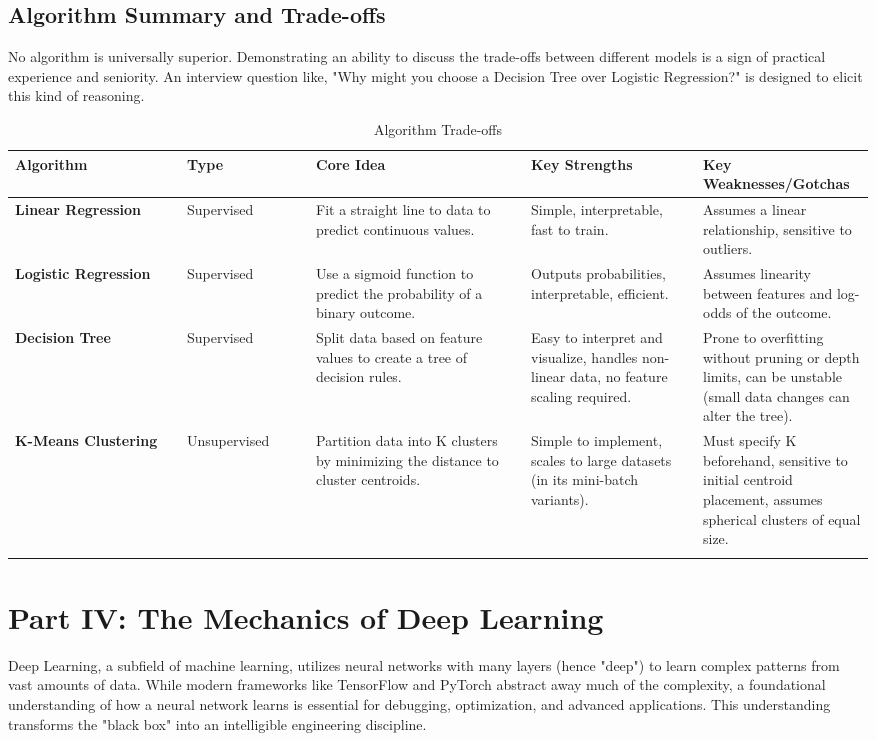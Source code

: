 \documentclass[11pt,a4paper]{article}
\begin{document}
\subsection{Algorithm Summary and Trade-offs}

No algorithm is universally superior. Demonstrating an ability to discuss the trade-offs between different models is a sign of practical experience and seniority. An interview question like, "Why might you choose a Decision Tree over Logistic Regression?" is designed to elicit this kind of reasoning.

\begin{longtable}{p{0.2\linewidth} p{0.15\linewidth} p{0.25\linewidth} p{0.2\linewidth} p{0.2\linewidth}}
\toprule
\textbf{Algorithm} & \textbf{Type} & \textbf{Core Idea} & \textbf{Key Strengths} & \textbf{Key Weaknesses/Gotchas} \\
\midrule
\endhead
\textbf{Linear Regression} & Supervised & Fit a straight line to data to predict continuous values. & Simple, interpretable, fast to train. & Assumes a linear relationship, sensitive to outliers. \\
\midrule
\textbf{Logistic Regression} & Supervised & Use a sigmoid function to predict the probability of a binary outcome. & Outputs probabilities, interpretable, efficient. & Assumes linearity between features and log-odds of the outcome. \\
\midrule
\textbf{Decision Tree} & Supervised & Split data based on feature values to create a tree of decision rules. & Easy to interpret and visualize, handles non-linear data, no feature scaling required. & Prone to overfitting without pruning or depth limits, can be unstable (small data changes can alter the tree). \\
\midrule
\textbf{K-Means Clustering} & Unsupervised & Partition data into K clusters by minimizing the distance to cluster centroids. & Simple to implement, scales to large datasets (in its mini-batch variants). & Must specify K beforehand, sensitive to initial centroid placement, assumes spherical clusters of equal size. \\
\bottomrule
\caption{Algorithm Trade-offs}
\end{longtable}

\section{Part IV: The Mechanics of Deep Learning}

Deep Learning, a subfield of machine learning, utilizes neural networks with many layers (hence "deep") to learn complex patterns from vast amounts of data. While modern frameworks like TensorFlow and PyTorch abstract away much of the complexity, a foundational understanding of how a neural network learns is essential for debugging, optimization, and advanced applications. This understanding transforms the "black box" into an intelligible engineering discipline.
\end{document}
